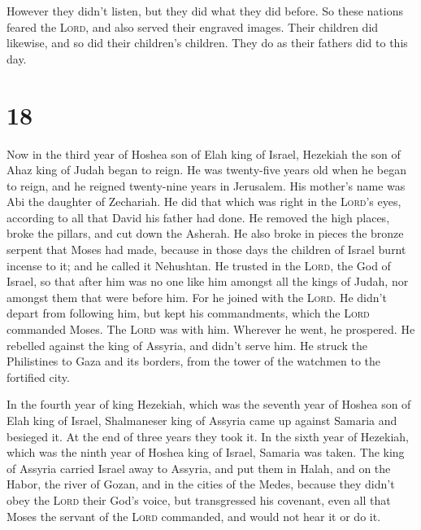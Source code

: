  However they didn't listen, but they did what they did
before.  So these nations feared the \textsc{Lord}, and
also served their engraved images. Their children did likewise, and so
did their children's children. They do as their fathers did to this day.

\hypertarget{section-17}{%
\section{18}\label{section-17}}

 Now in the third year of Hoshea son of Elah king of
Israel, Hezekiah the son of Ahaz king of Judah began to reign.
 He was twenty-five years old when he began to reign, and
he reigned twenty-nine years in Jerusalem. His mother's name was Abi the
daughter of Zechariah.  He did that which was right in the
\textsc{Lord}'s eyes, according to all that David his father had done.
 He removed the high places, broke the pillars, and cut
down the Asherah. He also broke in pieces the bronze serpent that Moses
had made, because in those days the children of Israel burnt incense to
it; and he called it Nehushtan.  He trusted in the
\textsc{Lord}, the God of Israel, so that after him was no one like him
amongst all the kings of Judah, nor amongst them that were before him.
 For he joined with the \textsc{Lord}. He didn't depart
from following him, but kept his commandments, which the \textsc{Lord}
commanded Moses.  The \textsc{Lord} was with him. Wherever
he went, he prospered. He rebelled against the king of Assyria, and
didn't serve him.  He struck the Philistines to Gaza and
its borders, from the tower of the watchmen to the fortified city.

 In the fourth year of king Hezekiah, which was the
seventh year of Hoshea son of Elah king of Israel, Shalmaneser king of
Assyria came up against Samaria and besieged it.  At the
end of three years they took it. In the sixth year of Hezekiah, which
was the ninth year of Hoshea king of Israel, Samaria was taken.
 The king of Assyria carried Israel away to Assyria, and
put them in Halah, and on the Habor, the river of Gozan, and in the
cities of the Medes,  because they didn't obey the
\textsc{Lord} their God's voice, but transgressed his covenant, even all
that Moses the servant of the \textsc{Lord} commanded, and would not
hear it or do it.

